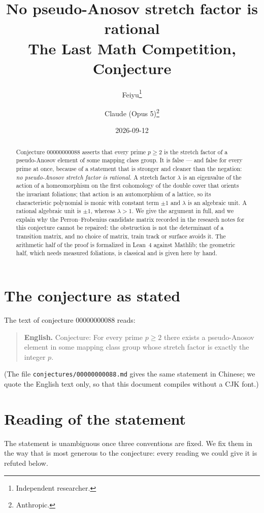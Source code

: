 \documentclass[11pt]{article}
\title{No pseudo-Anosov stretch factor is rational\\[0.4em]
\large The Last Math Competition, Conjecture \conjid}
\author{%
  Feiyu\thanks{Independent researcher.}
  \and
  Claude (Opus 5)\thanks{Anthropic.}%
}
\date{2026-09-12}
\theoremstyle{plain}
\theoremstyle{definition}
\theoremstyle{remark}
\newcommand{\conjid}{00000000088}
\begin{document}
\maketitle

\begin{abstract}
Conjecture \conjid{} asserts that every prime $p\ge2$ is the stretch factor of a
pseudo-Anosov element of some mapping class group. It is false --- and false for
every prime at once, because of a statement that is stronger and cleaner than the
negation: \emph{no pseudo-Anosov stretch factor is rational.} A stretch factor
$\lambda$ is an eigenvalue of the action of a homeomorphism on the first
cohomology of the double cover that orients the invariant foliations; that action
is an automorphism of a lattice, so its characteristic polynomial is monic with
constant term $\pm1$ and $\lambda$ is an algebraic unit. A rational algebraic unit
is $\pm1$, whereas $\lambda>1$. We give the argument in full, and we explain why
the Perron--Frobenius candidate matrix recorded in the research notes for this
conjecture cannot be repaired: the obstruction is not the determinant of a
transition matrix, and no choice of matrix, train track or surface avoids it. The
arithmetic half of the proof is formalized in Lean~4 against Mathlib; the
geometric half, which needs measured foliations, is classical and is given here by
hand.
\end{abstract}

\section{The conjecture as stated}

The text of conjecture \conjid{} reads:

\begin{quote}
\textbf{English.} Conjecture: For every prime $p \ge 2$ there exists a
pseudo-Anosov element in some mapping class group whose stretch factor is exactly
the integer $p$.
\end{quote}

\noindent
(The file \texttt{conjectures/\conjid.md} gives the same statement in Chinese; we
quote the English text only, so that this document compiles without a CJK font.)

\section{Reading of the statement}

The statement is unambiguous once three conventions are fixed. We fix them in the
way that is most generous to the conjecture: every reading we could give it is
refuted below.
\end{document}
